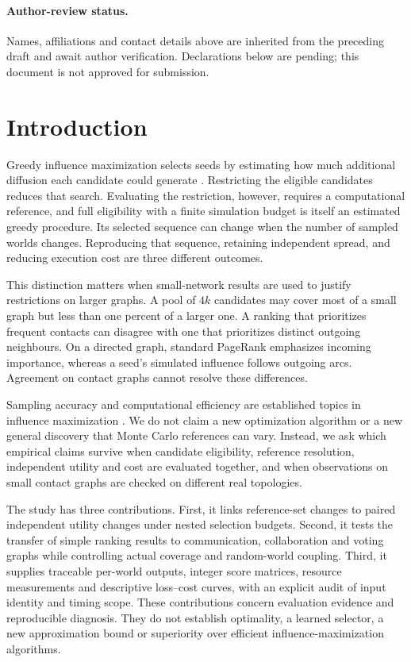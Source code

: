 \documentclass[smallextended]{svjour3}
\begin{document}
\paragraph{Author-review status.} Names, affiliations and contact details above are inherited from the preceding draft and await author verification. Declarations below are pending; this document is not approved for submission.

\section{Introduction}
Greedy influence maximization selects seeds by estimating how much additional diffusion each candidate could generate \cite{ref1}. Restricting the eligible candidates reduces that search. Evaluating the restriction, however, requires a computational reference, and full eligibility with a finite simulation budget is itself an estimated greedy procedure. Its selected sequence can change when the number of sampled worlds changes. Reproducing that sequence, retaining independent spread, and reducing execution cost are three different outcomes.

This distinction matters when small-network results are used to justify restrictions on larger graphs. A pool of $4k$ candidates may cover most of a small graph but less than one percent of a larger one. A ranking that prioritizes frequent contacts can disagree with one that prioritizes distinct outgoing neighbours. On a directed graph, standard PageRank emphasizes incoming importance, whereas a seed's simulated influence follows outgoing arcs. Agreement on contact graphs cannot resolve these differences.

Sampling accuracy and computational efficiency are established topics in influence maximization \cite{ref2,ref8,ref9,ref16}. We do not claim a new optimization algorithm or a new general discovery that Monte Carlo references can vary. Instead, we ask which empirical claims survive when candidate eligibility, reference resolution, independent utility and cost are evaluated together, and when observations on small contact graphs are checked on different real topologies.

The study has three contributions. First, it links reference-set changes to paired independent utility changes under nested selection budgets. Second, it tests the transfer of simple ranking results to communication, collaboration and voting graphs while controlling actual coverage and random-world coupling. Third, it supplies traceable per-world outputs, integer score matrices, resource measurements and descriptive loss--cost curves, with an explicit audit of input identity and timing scope. These contributions concern evaluation evidence and reproducible diagnosis. They do not establish optimality, a learned selector, a new approximation bound or superiority over efficient influence-maximization algorithms.
\end{document}
